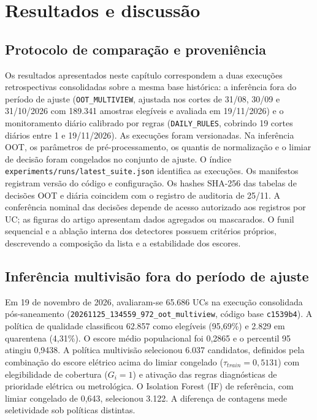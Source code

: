 \chapter{Resultados e discussão}\label{resultados-e-discussao}
\section{Protocolo de comparação e proveniência}
Os resultados apresentados neste capítulo correspondem a duas execuções retrospectivas consolidadas sobre a mesma base histórica: a inferência fora do período de ajuste (\texttt{OOT\_MULTIVIEW}, ajustada nos cortes de 31/08, 30/09 e 31/10/2026 com 189.341 amostras elegíveis e avaliada em 19/11/2026) e o monitoramento diário calibrado por regras (\texttt{DAILY\_RULES}, cobrindo 19 cortes diários entre 1\textordmasculine{} e 19/11/2026). As execuções foram versionadas. Na inferência OOT, os parâmetros de pré-processamento, os quantis de normalização e o limiar de decisão foram congelados no conjunto de ajuste. O índice \texttt{experiments/runs/latest\_suite.json} identifica as execuções. Os manifestos registram versão do código e configuração. Os hashes SHA-256 das tabelas de decisões OOT e diária coincidem com o registro de auditoria de 25/11. A conferência nominal das decisões depende de acesso autorizado aos registros por UC; as figuras do artigo apresentam dados agregados ou mascarados. O funil sequencial e a ablação interna dos detectores possuem critérios próprios, descrevendo a composição da lista e a estabilidade dos escores.
\section{Inferência multivisão fora do período de ajuste}
Em 19 de novembro de 2026, avaliaram-se 65.686 UCs na execução consolidada pós-saneamento (\texttt{20261125\_134559\_972\_oot\_multiview}, código base \texttt{c1539b4}). A política de qualidade classificou 62.857 como elegíveis (95,69\%) e 2.829 em quarentena (4,31\%). O escore médio populacional foi 0,2865 e o percentil 95 atingiu 0,9438. A política multivisão selecionou 6.037 candidatos, definidos pela combinação do escore elétrico acima do limiar congelado ($\tau_{train}=0{,}5131$) com elegibilidade de cobertura ($G_i=1$) e ativação das regras diagnósticas de prioridade elétrica ou metrológica. O Isolation Forest (IF) de referência, com limiar congelado de 0,643, selecionou 3.122. A diferença de contagens mede seletividade sob políticas distintas.

